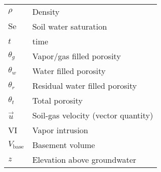 \documentclass[journal=esthag,manuscript=article]{achemso}
\begin{document}
\begin{table}[htb!]
\begin{tabular}{l l}
  $\rho$ & Density \\
  $\mathrm{Se}$ & Soil water saturation \\
  $t$ & time \\
  $\theta_g$ & Vapor/gas filled porosity \\
  $\theta_w$ & Water filled porosity \\
  $\theta_r$ & Residual water filled porosity \\
  $\theta_t$ & Total porosity \\
  $\vec{u}$ & Soil-gas velocity (vector quantity) \\
  VI & Vapor intrusion \\
  $V_\mathrm{base}$ & Basement volume \\
  $z$ & Elevation above groundwater \\
  \bottomrule
\end{tabular}
\end{table}


\end{document}
